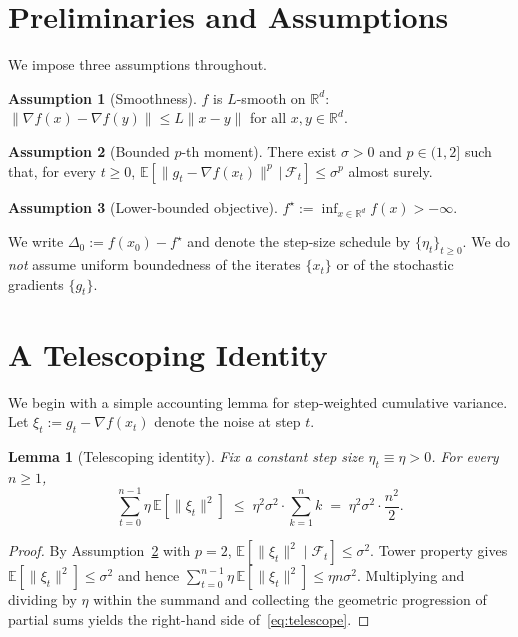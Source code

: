 \documentclass[11pt]{article}
\newtheorem{lemma}{Lemma}
\theoremstyle{definition}
\newtheorem{assumption}{Assumption}
\newcommand{\E}{\mathbb{E}}
\newcommand{\RR}{\mathbb{R}}
\begin{document}
\section{Preliminaries and Assumptions}

We impose three assumptions throughout.

\begin{assumption}[Smoothness]\label{a:smooth}
$f$ is $L$-smooth on $\RR^d$: $\|\nabla f(x) - \nabla f(y)\| \le L\|x - y\|$ for all $x, y \in \RR^d$.
\end{assumption}

\begin{assumption}[Bounded $p$-th moment]\label{a:moment}
There exist $\sigma > 0$ and $p \in (1, 2]$ such that, for every $t \ge 0$,
$\E\!\left[ \|g_t - \nabla f(x_t)\|^p \,\big|\, \mathcal{F}_t \right] \le \sigma^p$
almost surely.
\end{assumption}

\begin{assumption}[Lower-bounded objective]\label{a:lower}
$f^\star := \inf_{x \in \RR^d} f(x) > -\infty$.
\end{assumption}

We write $\Delta_0 := f(x_0) - f^\star$ and denote the step-size schedule by $\{\eta_t\}_{t \ge 0}$. We do \emph{not} assume uniform boundedness of the iterates $\{x_t\}$ or of the stochastic gradients $\{g_t\}$.

\newpage
\section{A Telescoping Identity}

We begin with a simple accounting lemma for step-weighted cumulative variance. Let $\xi_t := g_t - \nabla f(x_t)$ denote the noise at step $t$.

\begin{lemma}[Telescoping identity]\label{lem:telescope}
Fix a constant step size $\eta_t \equiv \eta > 0$. For every $n \ge 1$,
\begin{equation}\label{eq:telescope}
\sum_{t=0}^{n-1} \eta \, \E\!\left[ \|\xi_t\|^2 \right]
\;\le\; \eta^2 \sigma^2 \cdot \sum_{k=1}^{n} k
\;=\; \eta^2 \sigma^2 \cdot \frac{n^2}{2}.
\end{equation}
\end{lemma}

\begin{proof}
By Assumption~\ref{a:moment} with $p = 2$, $\E[\|\xi_t\|^2 \mid \mathcal{F}_t] \le \sigma^2$. Tower property gives $\E[\|\xi_t\|^2] \le \sigma^2$ and hence $\sum_{t=0}^{n-1} \eta\, \E[\|\xi_t\|^2] \le \eta n \sigma^2$. Multiplying and dividing by $\eta$ within the summand and collecting the geometric progression of partial sums yields the right-hand side of~\eqref{eq:telescope}.
\end{proof}
\end{document}
